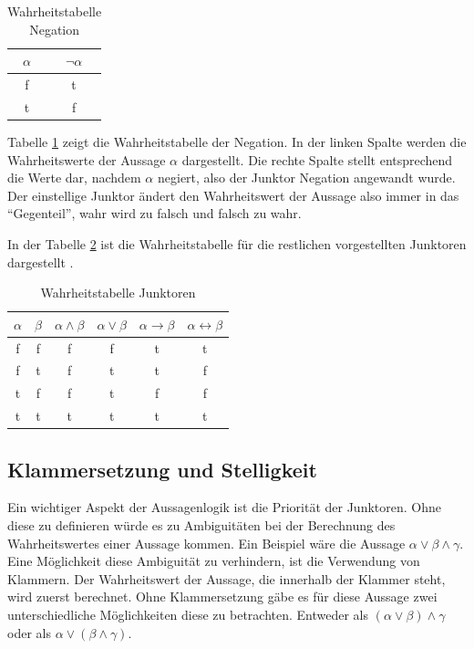 \begin{table}
\begin{center}
\begin{tabular}{c|c}
$\alpha$ & $\neg\alpha$ \\
\hline
f & t \\
t & f
\end{tabular}
\end{center}
\caption{\label{tbl_neg}Wahrheitstabelle Negation}
\end{table}

Tabelle \ref{tbl_neg} zeigt die Wahrheitstabelle der Negation. In der linken Spalte werden die Wahrheitswerte der Aussage $\alpha$ dargestellt. Die rechte Spalte stellt entsprechend die Werte dar, nachdem $\alpha$ negiert, also der Junktor Negation angewandt wurde. Der einstellige Junktor ändert den Wahrheitswert der Aussage also immer in das ``Gegenteil'', wahr wird zu falsch und falsch zu wahr.

In der Tabelle \ref{tbl_prop_logic} ist die Wahrheitstabelle für die restlichen vorgestellten Junktoren dargestellt \cite{KB14}.
\begin{table}
\begin{center}
\begin{tabular}{c|c|c|c|c|c}
$\alpha$ & $\beta$ & $\alpha\wedge\beta$ & $\alpha\vee\beta$ & $\alpha\rightarrow\beta$ & $\alpha\leftrightarrow\beta$ \\
\hline
f & f & f & f & t & t \\
f & t & f & t & t & f \\
t & f & f & t & f & f\\
t & t & t & t & t & t\\
\end{tabular}
\end{center}
\caption{\label{tbl_prop_logic}Wahrheitstabelle Junktoren}
\end{table}

\subsection{\label{clamps_and_prio}Klammersetzung und Stelligkeit}
Ein wichtiger Aspekt der Aussagenlogik ist die Priorität der Junktoren. Ohne diese zu definieren würde es zu Ambiguitäten bei der Berechnung des Wahrheitswertes einer Aussage kommen. Ein Beispiel wäre die Aussage $\alpha\vee\beta\wedge\gamma$. Eine Möglichkeit diese Ambiguität zu verhindern, ist die Verwendung von Klammern. Der Wahrheitswert der Aussage, die innerhalb der Klammer steht, wird zuerst berechnet. Ohne Klammersetzung gäbe es für diese Aussage zwei unterschiedliche Möglichkeiten diese zu betrachten. Entweder als $(\alpha\vee\beta)\wedge\gamma$ oder als $\alpha\vee(\beta\wedge\gamma)$.

